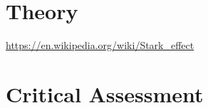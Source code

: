 

\section{Theory}


\url{https://en.wikipedia.org/wiki/Stark_effect}

\section{Critical Assessment}